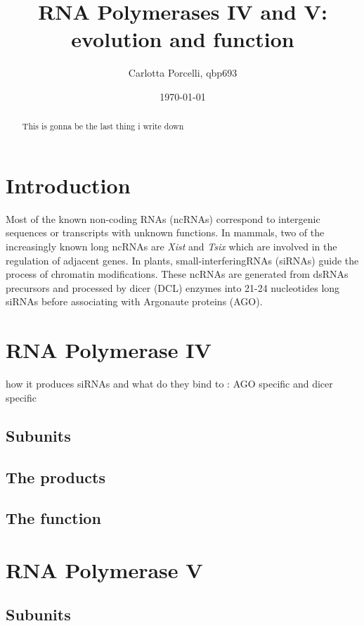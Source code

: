 \documentclass[a4paper, twocolumn]{article}
\title{RNA Polymerases IV and V: evolution and function}
\author{Carlotta Porcelli, qbp693}
\date{\today}
\begin{document}
\maketitle

\begin{abstract}
This is gonna be the last thing i write down

\end{abstract}

\section{Introduction}
Most of the known non-coding RNAs (ncRNAs) correspond to intergenic sequences or transcripts with unknown functions. In mammals, two of the increasingly known long ncRNAs are \textit{Xist} and \textit{Tsix} which are involved in the regulation of adjacent genes. 
In plants, small-interferingRNAs (siRNAs) guide the process of chromatin modifications. These ncRNAs are generated from dsRNAs precursors and processed by dicer (DCL) enzymes into 21-24 nucleotides long siRNAs before associating with Argonaute proteins (AGO). 

\section{RNA Polymerase IV}
how it produces siRNAs and what do they bind to : AGO specific and dicer specific \cite{Zhang130}

\subsection{Subunits}

\subsection{The products}

\subsection{The function}

\section{RNA Polymerase V}

\subsection{Subunits}
\end{document}

